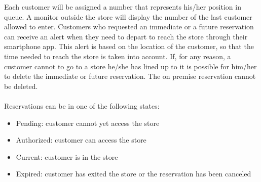 Each customer will be assigned a number that represents his/her position in queue. A monitor outside the store will display the number of the last customer allowed to enter.
Customers who requested an immediate or a future reservation can receive an alert when they need to depart to reach the store through their smartphone app.
This alert is based on the location of the customer, so that the time needed to reach the store is taken into account. If, for any reason, a customer cannot to go to a store he/she has lined up to it is possible for him/her to delete the immediate or future reservation. The on premise reservation cannot be deleted.\\\\
Reservations can be in one of the following states:
\begin{itemize}
	\item Pending: customer cannot yet access the store
	\item Authorized: customer can access the store
	\item Current: customer is in the store
	\item Expired: customer has exited the store or the reservation has been canceled
\end{itemize} 
